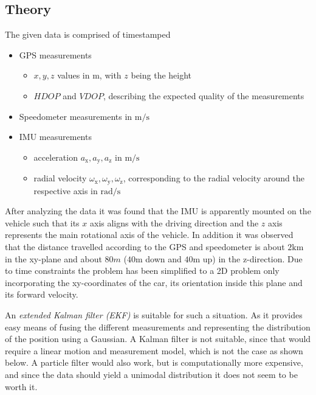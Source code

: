 \documentclass[11pt,a4paper]{article}
\begin{document}
	\subsection{Theory}
	The given data is comprised of timestamped
	\begin{itemize}
	    \item GPS measurements
	    \begin{itemize}
	        \item $x,y,z$ values in $\mathrm{m}$, with $z$ being the height
	        \item $HDOP$ and $VDOP$, describing the expected quality of the measurements
	    \end{itemize}
	    \item Speedometer measurements in $\mathrm{m}/\mathrm{s}$
	    \item IMU measurements
	    \begin{itemize}
	        \item acceleration $a_\mathrm{x},a_\mathrm{y},a_\mathrm{z}$ in $\mathrm{m}/\mathrm{s}$
	        \item radial velocity $\omega_\mathrm{x}, \omega_\mathrm{y}, \omega_\mathrm{z}$, corresponding to the radial velocity around the respective axis in $\mathrm{rad}/\mathrm{s}$
	    \end{itemize}
	\end{itemize}
	After analyzing the data it was found that the IMU is apparently mounted on the vehicle such that its $x$ axis aligns with the driving direction and the $z$ axis represents the main rotational axis of the vehicle. In addition it was observed that the distance travelled according to the GPS and speedometer is about $2\mathrm{km}$ in the  xy-plane and about $80m$ ($40\mathrm{m}$ down and $40\mathrm{m}$ up) in the z-direction. Due to time constraints the problem has been simplified to a 2D problem only incorporating the xy-coordinates of the car, its orientation inside this plane and its forward velocity.
	
	An \emph{extended Kalman filter (EKF)} is suitable for such a situation. As it provides easy means of fusing the different measurements and representing the distribution of the position using a Gaussian. A Kalman filter is not suitable, since that would require a linear motion and measurement model, which is not the case as shown below. A particle filter would also work, but is computationally more expensive, and since the data should yield a unimodal distribution it does not seem to be worth it.
	
\end{document}
